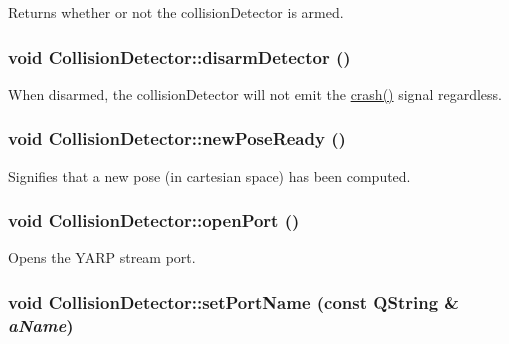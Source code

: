 Returns whether or not the collisionDetector is armed. \hypertarget{class_collision_detector_a0ff5daf20c76c64a2e284f93bd5e50a3}{
\subsubsection[{disarmDetector}]{\setlength{\rightskip}{0pt plus 5cm}void CollisionDetector::disarmDetector ()}}
\label{class_collision_detector_a0ff5daf20c76c64a2e284f93bd5e50a3}


When disarmed, the collisionDetector will not emit the \hyperlink{class_collision_detector_a7a6c1a9b11907db7252b6544ee1ce8b4}{crash()} signal regardless. \hypertarget{class_collision_detector_a9540d0ce34c4721abb8bf9bfcb1f67dd}{
\subsubsection[{newPoseReady}]{\setlength{\rightskip}{0pt plus 5cm}void CollisionDetector::newPoseReady ()}}
\label{class_collision_detector_a9540d0ce34c4721abb8bf9bfcb1f67dd}


Signifies that a new pose (in cartesian space) has been computed. \hypertarget{class_collision_detector_a1fa9e503fff5d46bd3b068dc8cd98fe4}{
\subsubsection[{openPort}]{\setlength{\rightskip}{0pt plus 5cm}void CollisionDetector::openPort ()}}
\label{class_collision_detector_a1fa9e503fff5d46bd3b068dc8cd98fe4}


Opens the YARP stream port. \hypertarget{class_collision_detector_acd233230c6fd897f206e1fe016b7521d}{
\subsubsection[{setPortName}]{\setlength{\rightskip}{0pt plus 5cm}void CollisionDetector::setPortName (const QString \& {\em aName})}}
\label{class_collision_detector_acd233230c6fd897f206e1fe016b7521d}


